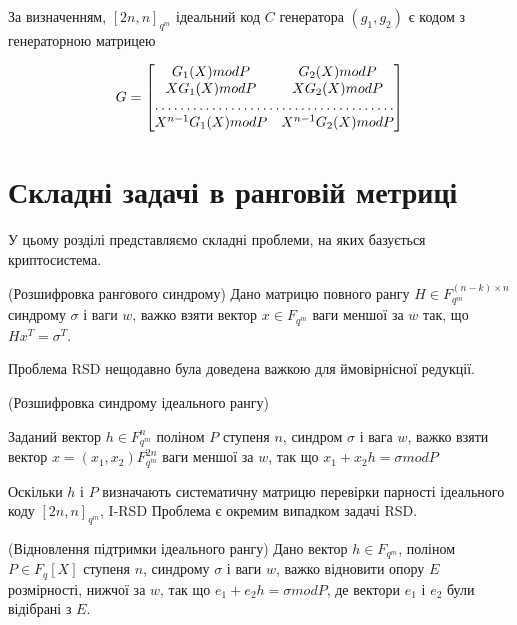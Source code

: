 За визначенням, $[2n,n]_{q^m}$ ідеальний код $C$ генератора $(g_1,g_2)$ є кодом з генераторною матрицею

\begin{equation}
    G = \begin{bmatrix}
        G_{1}(X) mod P & G_{2}(X) mod P \\
        X G_{1}(X) mod P & X G_{2}(X) mod P \\
        \hdotsfor{2} \\
        X^{n-1} G_{1}(X) mod P & X^{n-1} G_{2}(X) mod P
    \end{bmatrix}
\end{equation}

\section{Складні задачі в ранговій метриці}

У цьому розділі представляємо складні проблеми, на яких базується криптосистема.

\begin{problem} (Розшифровка рангового синдрому) 
    Дано матрицю повного рангу $H \in F_{q^m}^{(n-k) \times n}$
    синдрому $\sigma$ і ваги $w$, важко взяти вектор $x \in F_{q^m}$ ваги меншої за $w$
    так, що $Hx^T =\sigma^T$.
\end{problem}

Проблема RSD нещодавно була доведена важкою для ймовірнісної редукції.

\begin{problem} (Розшифровка синдрому ідеального рангу)

    Заданий вектор $h \in F^n_{q^m}$ поліном $P$ ступеня $n$, синдром $\sigma$ і вага $w$, важко взяти вектор 
    $x = (x_1, x_2) F^{2n}_{q^m}$ ваги меншої за $w$, так що $x_1 + x_2 h = \sigma mod P$
\end{problem}

Оскільки $h$ і $P$ визначають систематичну матрицю перевірки парності ідеального коду $[2n,n]_{q^m}$,
I-RSD Проблема є окремим випадком задачі RSD.

\begin{problem} (Відновлення підтримки ідеального рангу)
    Дано вектор $h \in F_{q^m}$, поліном
    $P \in F_q[X]$ ступеня $n$, синдрому $\sigma$ і ваги $w$, важко відновити опору $E$ розмірності, нижчої за $w$, 
    так що $e_1 + e_2h = \sigma mod P$, де вектори $e_1$ і $e_2$ були відібрані з $E$.
\end{problem}


